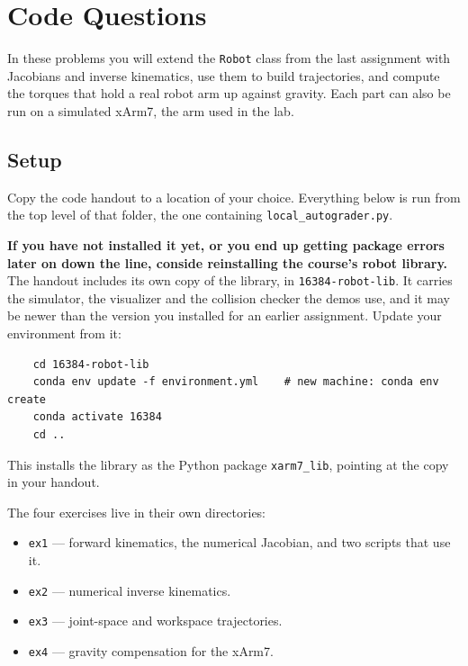 \documentclass{16384_doc}
\begin{document}
\section{Code Questions}

\sloppy

In these problems you will extend the \verb!Robot! class from the last
assignment with Jacobians and inverse kinematics, use them to build
trajectories, and compute the torques that hold a real robot arm up against
gravity. Each part can also be run on a simulated xArm7, the arm used in the
lab.

\subsection*{Setup}

Copy the code handout to a location of your choice. Everything below is run
from the top level of that folder, the one containing
\verb!local_autograder.py!.

\textbf{If you have not installed it yet, or you end up getting package errors later on down the line, conside reinstalling the course's robot library.} The handout includes its own
copy of the library, in \verb!16384-robot-lib!. It carries the simulator, the
visualizer and the collision checker the demos use, and it may be newer than
the version you installed for an earlier assignment. Update your environment
from it:

\begin{verbatim}
    cd 16384-robot-lib
    conda env update -f environment.yml    # new machine: conda env create
    conda activate 16384
    cd ..
\end{verbatim}

This installs the library as the Python package \verb!xarm7_lib!, pointing at
the copy in your handout.

The four exercises live in their own directories:

\begin{itemize}
    \item \verb!ex1! --- forward kinematics, the numerical Jacobian, and two
        scripts that use it.
    \item \verb!ex2! --- numerical inverse kinematics.
    \item \verb!ex3! --- joint-space and workspace trajectories.
    \item \verb!ex4! --- gravity compensation for the xArm7.
\end{itemize}
\end{document}
